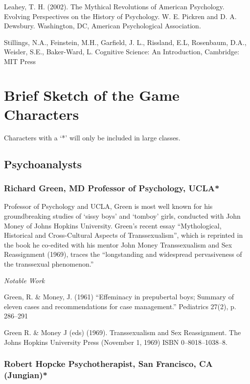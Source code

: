 Leahey, T. H. (2002). The Mythical Revolutions of American Psychology. Evolving Perspectives on the History of Psychology. W. E. Pickren and D. A. Dewsbury. Washington, DC, American Psychological Association.

Stillings, N.A., Feinstein, M.H., Garfield, J. L., Rissland, E.L, Rosenbaum, D.A., Weisler, S.E., Baker-Ward, L. Cognitive Science: An Introduction, Cambridge: MIT Press

\section{Brief Sketch of the Game Characters}
\label{briefsketchofthegamecharacters}

Characters with a `*' will only be included in large classes.

\subsection{Psychoanalysts}
\label{psychoanalysts}

\subsubsection{Richard Green, MD Professor of Psychology, UCLA*}
\label{richardgreenmdprofessorofpsychologyucla}

Professor of Psychology and UCLA, Green is most well known for his groundbreaking studies of `sissy boys' and `tomboy' girls, conducted with John Money of Johns Hopkins University. Green's recent essay ``Mythological, Historical and Cross-Cultural Aspects of Transsexualism'', which is reprinted in the book he co-edited with his mentor John Money Transsexualism and Sex Reassignment (1969), traces the ``longstanding and widespread pervasiveness of the transsexual phenomenon.''

\emph{Notable Work}

Green, R. \& Money, J. (1961) ``Effeminacy in prepubertal boys; Summary of eleven cases and recommendations for case management.'' Pediatrics 27(2), p. 286--291

Green R. \& Money J (eds) (1969). Transsexualism and Sex Reassignment. The Johns Hopkins University Press (November 1, 1969) ISBN 0--8018--1038--8.

\subsubsection{Robert Hopcke Psychotherapist, San Francisco, CA (Jungian)*}
\label{roberthopckepsychotherapistsanfranciscocajungian}

